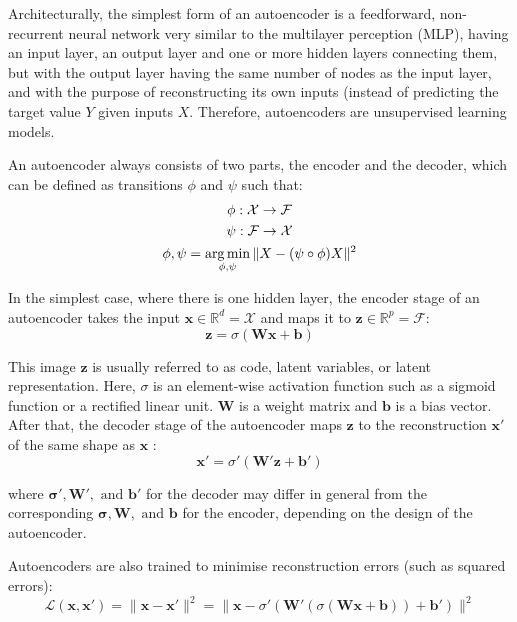 \documentclass{mcmthesis}
\begin{document}
Architecturally, the simplest form of an autoencoder is a feedforward, non-recurrent neural network very similar to the multilayer perception (MLP), having an input layer, an output layer and one or more hidden layers connecting them, but with the output layer having the same number of nodes as the input layer, and with the purpose of reconstructing its own inputs (instead of predicting the target value $Y$ given inputs $X$. Therefore, autoencoders are unsupervised learning models.

An autoencoder always consists of two parts, the encoder and the decoder, which can be defined as transitions $\phi$  and $\psi$ such that:
\begin{gather}
\phi :{\mathcal {X}}\rightarrow {\mathcal {F}} \notag\\
\psi :{\mathcal {F}}\rightarrow {\mathcal {X}} \notag\\
\phi ,\psi ={\underset {\phi ,\psi }{\operatorname {arg\,min} }}\,\|X-(\psi \circ \phi )X\|^{2}
\end{gather}

In the simplest case, where there is one hidden layer, the encoder stage of an autoencoder takes the input $\mathbf {x} \in \mathbb {R} ^{d}={\mathcal {X}}$ and maps it to $\mathbf {z} \in \mathbb {R} ^{p}={\mathcal {F}}$:
\begin{equation}
    \mathbf {z} =\sigma (\mathbf {Wx} +\mathbf {b} )
\end{equation}

This image $\mathbf {z}$  is usually referred to as code, latent variables, or latent representation. Here, $\sigma$  is an element-wise activation function such as a sigmoid function or a rectified linear unit. $\mathbf {W}$  is a weight matrix and $\mathbf {b}$  is a bias vector. After that, the decoder stage of the autoencoder maps $\mathbf {z}$  to the reconstruction $\mathbf {x'}$  of the same shape as $\mathbf {x}$ :
\begin{equation}
    \mathbf {x'} =\sigma '(\mathbf {W'z} +\mathbf {b'} )
\end{equation}


where $ \mathbf {\sigma '} ,\mathbf {W'} ,{\text{ and }}\mathbf {b'} $ for the decoder may differ in general from the corresponding $ \mathbf {\sigma } ,\mathbf {W} ,{\text{ and }}\mathbf {b} $ for the encoder, depending on the design of the autoencoder.

Autoencoders are also trained to minimise reconstruction errors (such as squared errors):
\begin{equation}
     {\mathcal {L}}(\mathbf {x} ,\mathbf {x'} )=\|\mathbf {x} -\mathbf {x'} \|^{2}=\|\mathbf {x} -\sigma '(\mathbf {W'} (\sigma (\mathbf {Wx} +\mathbf {b} ))+\mathbf {b'} )\|^{2}
\end{equation}
\end{document}
